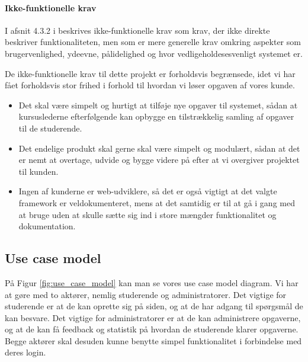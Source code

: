 \documentclass[11pt, a4paper]{article}
\begin{document}
\paragraph{Ikke-funktionelle krav}
\label{par:ikke_funktionelle_krav}
I afsnit 4.3.2 i \cite{OOSE} beskrives ikke-funktionelle krav som krav, der ikke direkte beskriver funktionaliteten, men som er mere generelle krav omkring aspekter som brugervenlighed, ydeevne, pålidelighed og hvor vedligeholdesesvenligt systemet er.

De ikke-funktionelle krav til dette projekt er forholdsvis begrænsede, idet vi har fået forholdsvis stor frihed i forhold til hvordan vi løser opgaven af vores kunde.

\begin{itemize}
\item Det skal være simpelt og hurtigt at tilføje nye opgaver til systemet, sådan at kursuslederne efterfølgende kan opbygge en tilstrækkelig samling af opgaver til de studerende.
\item Det endelige produkt skal gerne skal være simpelt og modulært, sådan at det er nemt at overtage, udvide og bygge videre på efter at vi overgiver projektet til kunden.
\item Ingen af kunderne er web-udviklere, så det er også vigtigt at det valgte framework er veldokumenteret, mens at det samtidig er til at gå i gang med at bruge uden at skulle sætte sig ind i store mængder funktionalitet og dokumentation.
\end{itemize}

\subsection{Use case model}
\label{sub:use_case_model}
På Figur \ref{fig:use_case_model} kan man se vores use case model diagram. Vi har at gøre med to aktører, nemlig studerende og administratorer. Det vigtige for studerende er at de kan oprette sig på siden, og at de har adgang til spørgsmål de kan besvare. Det vigtige for administratorer er at de kan administrere opgaverne, og at de kan få feedback og statistik på hvordan de studerende klarer opgaverne. Begge aktører skal desuden kunne benytte simpel funktionalitet i forbindelse med deres login.
\end{document}
